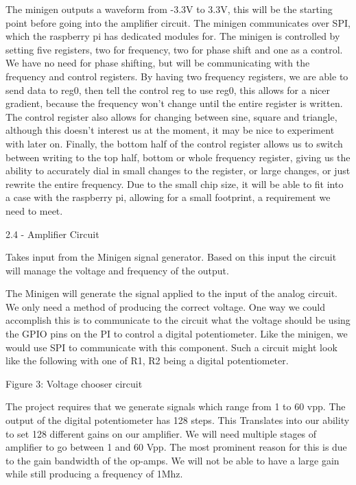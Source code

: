 \documentclass{article}	%
\begin{document}
\begin{multicols}{2}
The minigen outputs a waveform from -3.3V to 3.3V, this will be the starting point before going into the amplifier circuit. The minigen communicates over SPI, which the raspberry pi has dedicated modules for. The minigen is controlled by setting five registers, two for frequency, two for phase shift and one as a control. We have no need for phase shifting, but will be communicating with the frequency and control registers. By having two frequency registers, we are able to send data to reg0, then tell the control reg to use reg0, this allows for a nicer gradient, because the frequency won’t change until the entire register is written. The control register also allows for changing between sine, square and triangle, although this doesn’t interest us at the moment, it may be nice to experiment with later on. Finally, the bottom half of the control register allows us to switch between writing to the top half, bottom or whole frequency register, giving us the ability to accurately dial in small changes to the register, or large changes, or just rewrite the entire frequency. Due to the small chip size, it will be able to fit into a case with the raspberry pi, allowing for a small footprint, a requirement we need to meet.  



2.4 - Amplifier Circuit

Takes input from the Minigen signal generator. Based on this input the circuit will manage the voltage and frequency of the output.

The Minigen will generate the signal applied to the input of the analog circuit. We only need a method of producing the correct voltage. One way we could accomplish this is to communicate to the circuit what the voltage should be using the GPIO pins on the PI to control a digital potentiometer. Like the minigen, we would use SPI to communicate with this component. Such a circuit might look like the following with one of R1, R2 being a digital potentiometer.

Figure 3: Voltage chooser circuit

The project requires that we generate signals which range from 1 to 60 vpp. The output of the digital potentiometer has 128 steps. This Translates into our ability to set 128 different gains on our amplifier. We will need multiple stages of amplifier to go between 1 and 60 Vpp. The most prominent reason for this is due to the gain bandwidth of the op-amps. We will not be able to have a large gain while still producing a frequency of 1Mhz.


\end{multicols}
\end{document}
